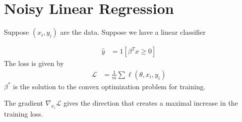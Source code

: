 \documentclass[book.tex]{subfiles}
\begin{document}
\section{Noisy Linear Regression}

Suppose $(x_i, y_i)$ are the data. Suppose we have a linear classifier

\begin{align}
    \hat{y} &= 1[\beta^T x \geq 0]
\end{align}
The loss is given by
\begin{align}
    \mathcal{L} &= \frac{1}{m} \sum \ell(\theta, x_i, y_i)
\end{align}
$\beta^*$ is the solution to the convex optimization problem for training. 


The gradient $\nabla_{x_i} \mathcal{L}$ gives the direction that creates a maximal increase in the training loss.
\end{document}
